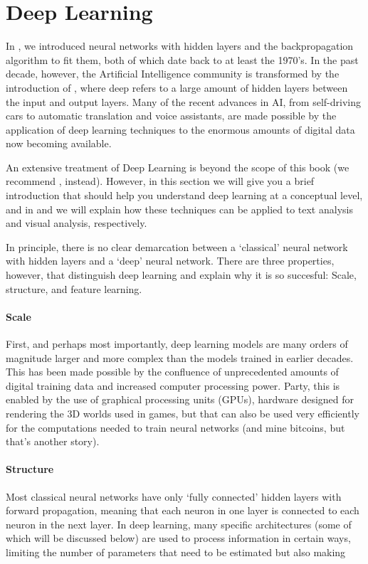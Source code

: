 \section{Deep Learning}

In , we introduced neural networks with hidden layers and the backpropagation algorithm to fit them,
both of which date back to at least the 1970's.
In the past decade, however, the Artificial Intelligence community is transformed by the introduction of ,
where deep refers to a large amount of hidden layers between the input and output layers.
Many of the recent advances in AI, from self-driving cars to automatic translation and voice assistants,
are made possible by the application of deep learning techniques to the enormous amounts of digital data now becoming available. 

An extensive treatment of Deep Learning is beyond the scope of this book (we recommend \cite{geron2019hands}, instead).
However, in this section we will give you a brief introduction that should help you understand deep learning at a conceptual level,
and in  and  we will explain how these techniques can be applied to text analysis and visual analysis, respectively. 

In principle, there is no clear demarcation between a `classical' neural network with hidden layers and a `deep' neural network.
There are three properties, however, that distinguish deep learning and explain why it is so succesful: Scale, structure, and feature learning.

\paragraph{Scale} First, and perhaps most importantly, deep learning models are many orders of magnitude larger and more complex than the models
trained in earlier decades.
This has been made possible by the confluence of unprecedented amounts of digital training data and increased computer processing power.
Party, this is enabled by the use of graphical processing units (GPUs), hardware designed for rendering the 3D worlds used in games,
but that can also be used very efficiently for the computations needed to train neural networks (and mine bitcoins, but that's another story).

\paragraph{Structure} Most classical neural networks have only `fully connected' hidden layers with forward propagation,
meaning that each neuron in one layer is connected to each neuron in the next layer.
In deep learning, many specific architectures (some of which will be discussed below) are used to process information in certain ways,
limiting the number of parameters that need to be estimated but also making

